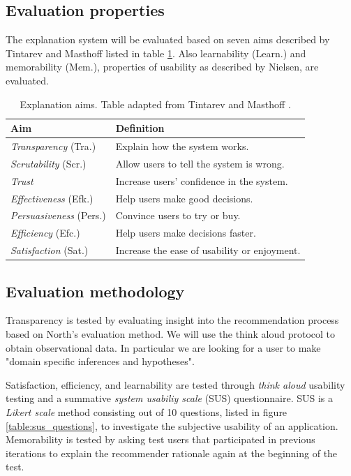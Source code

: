 \subsection{Evaluation properties}\label{introduction:objective:properties}

The explanation system will be evaluated based on seven aims described by Tintarev and Masthoff \cite{tintarev:2007:SER:1547550.1547664} listed in table \ref{table:explanation:aims}. Also learnability (Learn.) and memorability (Mem.), properties of usability as described by Nielsen\cite{nielsen:1993:UE:529793}, are evaluated.

\begin{table}
	\caption{Explanation aims. Table adapted from Tintarev and Masthoff \cite{tintarev:2007:SER:1547550.1547664}.}
	\begin{tabular}{ p{130px} | p{300px} }
		\hline
		\textbf{Aim} 						& \textbf{Definition} \\
		\hline
		\textit{Transparency} (Tra.)		&	Explain how the system works. \\
		\textit{Scrutability}	(Scr.)		&	Allow users to tell the system is wrong. \\
		\textit{Trust}									&	Increase users' confidence in the system. \\
		\textit{Effectiveness} (Efk.)		&	Help users make good decisions. \\
		\textit{Persuasiveness}	(Pers.)	&	Convince users to try or buy. \\
		\textit{Efficiency}	(Efc.)			& Help users make decisions faster. \\
		\textit{Satisfaction} (Sat.)		& Increase the ease of usability or enjoyment. \\
		\hline
	\end{tabular}
	\label{table:explanation:aims}
\end{table}

\subsection{Evaluation methodology}\label{introduction:objective:methodology}

Transparency is tested by evaluating insight into the recommendation process based on North's evaluation method. We will use the think aloud protocol to obtain observational data. In particular we are looking for a user to make "domain specific inferences and hypotheses"\cite{north:2006}.

Satisfaction, efficiency, and learnability are tested through \emph{think aloud} usability testing and a summative \emph{system usabiliy scale} (SUS) questionnaire. SUS is a \emph{Likert scale} method consisting out of 10 questions, listed in figure \ref{table:sus_questions}, to investigate the subjective usability of an application\cite{brooke:1996}. Memorability is tested by asking test users that participated in previous iterations to explain the recommender rationale again at the beginning of the test.

